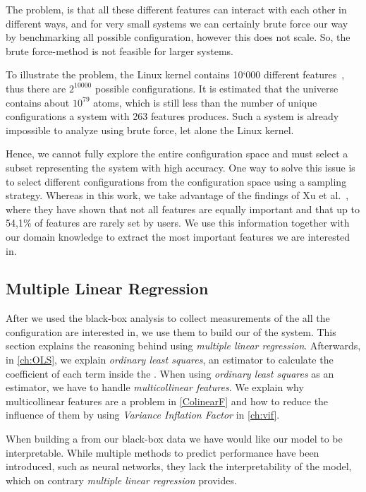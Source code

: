 The problem, is that all these different features can interact with each other in different ways, and for very small systems
we can certainly brute force our way by benchmarking all possible configuration, however this does not scale.
So, the brute force-method is not feasible for larger systems. 

To illustrate the problem, the Linux kernel contains 10`000 different features~\cite{Linux-Kernel}, thus there are $2^{10000}$
possible configurations.
It is estimated that the universe
contains about $10^{79}$ atoms, which is still less than the number of unique configurations a system with 263 features produces.
Such a system is already impossible to analyze using brute force, let alone the Linux kernel.

Hence, we cannot fully explore the entire configuration space and must select a subset representing the system with high accuracy. 
One way to solve this issue is to select different configurations from the configuration space using a sampling strategy.
Whereas in this work, we take advantage of the findings of Xu et al.~\cite{TooManyKnobs}, 
where they have shown that not all features are equally important and that up to 54,1\% of features are rarely set by users. 
We use this information together with our domain knowledge to extract the most important features we are interested in.


\subsection{Multiple Linear Regression} \label{ch:linear-regression}
After we used the black-box analysis to collect measurements of the all the configuration are interested in, 
we use them to build our {\perfInfluenceModel} of the system. 
This section explains the reasoning behind using \emph{multiple linear regression}. 
Afterwards, in \autoref{ch:OLS}, we explain \emph{ordinary least squares}, an estimator to calculate the coefficient of each term inside the \perfInfluenceModel. 
When using \emph{ordinary least squares} as an estimator, we have to handle \emph{multicollinear features}. 
We explain why multicollinear features are a problem in \autoref{ColinearF} and how to reduce the influence of them by using
 \emph{Variance Inflation Factor} in \autoref{ch:vif}.

When building a {\perfInfluenceModel} from our black-box data we have would like our model to be interpretable. While multiple 
methods to predict performance have been introduced, such as neural networks, they lack the interpretability of the model, which on contrary
\emph{multiple linear regression} provides.

